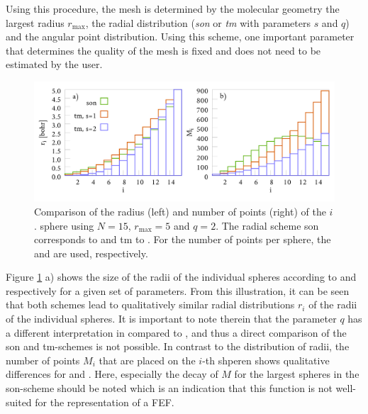 Using this procedure, the mesh is determined by the molecular geometry the largest radius $r_\text{max}$, the radial distribution (\textit{son} or \textit{tm} with parameters $s$ and $q$) and the angular point distribution.
Using this scheme, one important parameter that determines the quality of the mesh is fixed and does not need to be estimated by the user.
\begin{figure}[h]
\includegraphics[width=\textwidth]{Data/radial_mapping}
\caption{Comparison of the radius (left) and number of points (right) of the $i$. sphere using $N=15$, $r_\text{max}=5$ and $q=2$.
The radial scheme son corresponds to  and  tm to .
For the number of points per sphere, the  and  are used, respectively.}
\label{fig:maps}
\end{figure}

Figure \ref{fig:maps} a) shows the size of the radii of the individual spheres according to  and  respectively for a given set of parameters.
From this illustration, it can be seen that both schemes lead to qualitatively similar radial distributions $r_i$ of the radii of the individual spheres.
It is important to note therein that the parameter $q$ has a different interpretation in  compared to , and thus a direct comparison of the son and tm-schemes is not possible.
In contrast to the distribution of radii, the number of points $M_i$ that are placed on the $i$-th shperen shows qualitative differences for  and .
Here, especially the decay of $M$ for the largest spheres in the son-scheme should be noted which is an indication that this function is not well-suited for the representation of a FEF.

